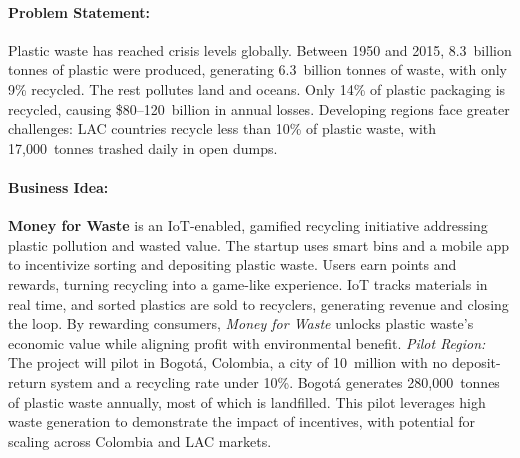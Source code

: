 \paragraph{Problem Statement:} Plastic waste has reached crisis levels globally. Between 1950 and 2015, 8.3~billion tonnes of plastic were produced, generating 6.3~billion tonnes of waste, with only 9\% recycled\autocite{Geyer2017}. The rest pollutes land and oceans. Only 14\% of plastic packaging is recycled, causing \$80--120~billion in annual losses\autocite{Ezeudu2024}. Developing regions face greater challenges: LAC countries recycle less than 10\% of plastic waste\autocite{UNEP2023}, with 17,000~tonnes trashed daily in open dumps\autocite{Husaini2024}.

\paragraph{Business Idea:} \textbf{Money for Waste} is an IoT-enabled, gamified recycling initiative addressing plastic pollution and wasted value. The startup uses smart bins and a mobile app to incentivize sorting and depositing plastic waste. Users earn points and rewards, turning recycling into a game-like experience. IoT tracks materials in real time, and sorted plastics are sold to recyclers, generating revenue and closing the loop. By rewarding consumers, \textit{Money for Waste} unlocks plastic waste's economic value while aligning profit with environmental benefit. \textit{Pilot Region:} The project will pilot in Bogotá, Colombia, a city of 10~million with no deposit-return system and a recycling rate under 10\%\autocite{UNEP2023}. Bogotá generates 280,000~tonnes of plastic waste annually, most of which is landfilled\autocite{UNEP2023}. This pilot leverages high waste generation to demonstrate the impact of incentives, with potential for scaling across Colombia and LAC markets.

